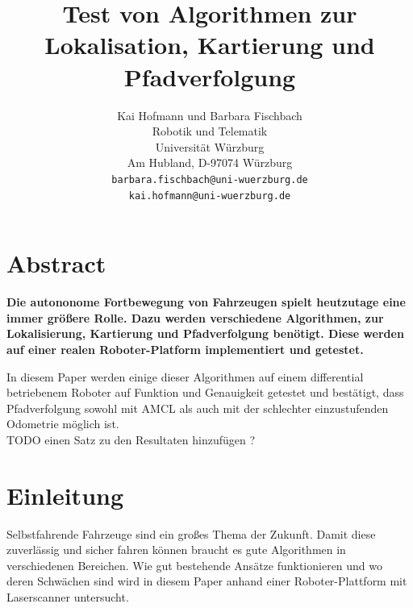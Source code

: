 \documentclass[11pt,a4paper]{article}
\begin{document}
\sloppy

\title{\Large\bf Test von Algorithmen zur Lokalisation, Kartierung und Pfadverfolgung }

\author{Kai Hofmann und Barbara Fischbach\\
  Robotik und Telematik \\
  Universit\"at W\"urzburg\\
  Am Hubland, D-97074 W\"urzburg\\
{\small \texttt{barbara.fischbach@uni-wuerzburg.de}}\\
{\small \texttt{kai.hofmann@uni-wuerzburg.de}}}

\date{}



\maketitle


\newpage

\twocolumn

\section*{Abstract}


	\textbf{Die autononome Fortbewegung von Fahrzeugen spielt heutzutage eine immer gr\"o\ss{}ere Rolle. Dazu werden verschiedene Algorithmen, zur Lokalisierung, Kartierung und Pfadverfolgung ben\"otigt. Diese werden auf einer realen Roboter-Platform implementiert und getestet.}
	
	In diesem Paper werden einige dieser Algorithmen auf einem differential betriebenem Roboter auf Funktion und Genauigkeit getestet und best\"atigt, dass Pfadverfolgung sowohl mit AMCL als auch mit der schlechter einzustufenden Odometrie m\"oglich ist.\\
	TODO einen Satz zu den Resultaten hinzufügen ? 

\section{Einleitung}
	Selbstfahrende Fahrzeuge sind ein gro{\ss}es Thema der Zukunft. Damit diese zuverl\"assig und sicher fahren k\"onnen braucht es gute Algorithmen in verschiedenen Bereichen. Wie gut bestehende Ans\"atze funktionieren und wo deren Schw\"achen sind wird in diesem Paper anhand einer Roboter-Plattform mit Laserscanner untersucht. 
\end{document}
